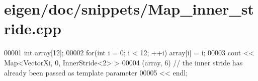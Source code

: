 \hypertarget{eigen_2doc_2snippets_2_map__inner__stride_8cpp_source}{}\section{eigen/doc/snippets/\+Map\+\_\+inner\+\_\+stride.cpp}
\label{eigen_2doc_2snippets_2_map__inner__stride_8cpp_source}

\begin{DoxyCode}
00001 \textcolor{keywordtype}{int} array[12];
00002 \textcolor{keywordflow}{for}(\textcolor{keywordtype}{int} i = 0; i < 12; ++i) array[i] = i;
00003 cout << Map<VectorXi, 0, InnerStride<2> >
00004          (array, 6) \textcolor{comment}{// the inner stride has already been passed as template parameter}
00005      << endl;
\end{DoxyCode}
